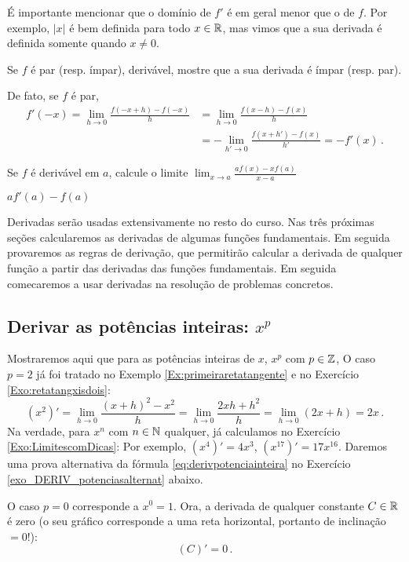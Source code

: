 \begin{obs}
É importante mencionar que o domínio de $f'$ é em geral menor que o de $f$.
Por exemplo, $|x|$ é bem  definida para todo $x\in \mathbb{R}$, mas
vimos que a sua derivada é definida
somente quando $x\neq 0$.
\end{obs}

\begin{exo}
Se $f$ é par (resp. ímpar), derivável, mostre que a sua derivada é ímpar (resp.
par).
\begin{sol}
De fato, se $f$ é par, 
\begin{align*}
f'(-x)=\lim_{h\to 0}\frac{f(-x+h)-f(-x)}{h}
&=\lim_{h\to 0}\frac{f(x-h)-f(x)}{h}\\
&=-\lim_{h'\to 0}\frac{f(x+h')-f(x)}{h'}=-f'(x)\,.
\end{align*}
\end{sol}
\end{exo}

\begin{exo}
Se $f$ é derivável em $a$, calcule o limite $\lim_{x\to
a}\frac{af(x)-xf(a)}{x-a}$
\begin{sol}
$af'(a)-f(a)$
\end{sol}
\end{exo}

Derivadas serão usadas extensivamente no resto do curso.
Nas três próximas seções calcularemos as derivadas de algumas funções
fundamentais. Em seguida provaremos as regras de derivação, que permitirão
calcular a derivada de qualquer função a partir das derivadas das funções
fundamentais. Em seguida comecaremos a usar derivadas na resolução de problemas
concretos.

\subsection{Derivar as potências inteiras: $x^{p}$}
Mostraremos aqui que para as potências inteiras de $x$, 
$x^p$ com $p\in \mathbb{Z}$,
O caso $p=2$ já foi tratado no Exemplo
\ref{Ex:primeiraretatangente} e no Exercício \ref{Exo:retatangxisdois}:
$$(x^2)'=\lim_{h\to 0}\frac{(x+h)^2-x^2}{h}=\lim_{h\to 0}\frac{2xh+h^2}{h}=
\lim_{h\to 0} (2x+h)=2x\,.
$$
Na verdade, para $x^n$ com $n\in \mathbb{N}$ qualquer, já calculamos no Exercício 
\ref{Exo:LimitescomDicas}:
Por exemplo, $(x^4)'=4x^3$, $(x^{17})'=17x^{16}$.
Daremos uma prova alternativa da fórmula 
\eqref{eq:derivpotenciainteira} no Exercício \ref{exo_DERIV_potenciasalternat} abaixo.
\begin{obs}
 O caso $p=0$ corresponde a $x^0=1$. Ora, a derivada de qualquer constante
$C\in \mathbb{R}$ é zero (o seu gráfico corresponde a uma reta horizontal, portanto de
inclinação $=0$!):
$$\boxed{(C)'=0\,.}$$
\end{obs}


